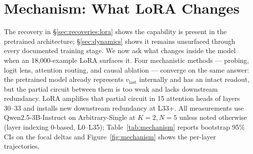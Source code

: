 %
%
%

\section{Mechanism: What LoRA Changes}
\label{sec:mechanism}

The recovery in \S\ref{sec:recoveries:lora} shows the capability is
present in the pretrained architecture; \S\ref{sec:dynamics} shows it
remains unsurfaced through every documented training stage. We now
ask what changes inside the model when an 18{,}000-example LoRA
surfaces it. Four mechanistic methods --- probing, logit lens,
attention routing, and causal ablation --- converge on the same
answer: the pretrained model already represents
$v_{\text{last}}$ internally and has an intact readout, but the
partial circuit between them is too weak and lacks downstream
redundancy. LoRA amplifies that partial circuit in 15 attention heads
of layers 30--33 and installs new downstream redundancy at L33+.
All measurements use Qwen2.5-3B-Instruct on Arbitrary-Single at
$K{=}2, N{=}5$ unless noted otherwise (layer indexing 0-based, L0--L35);
Table~\ref{tab:mechanism} reports bootstrap 95\% CIs on the focal deltas
and Figure~\ref{fig:mechanism} shows the per-layer trajectories.

